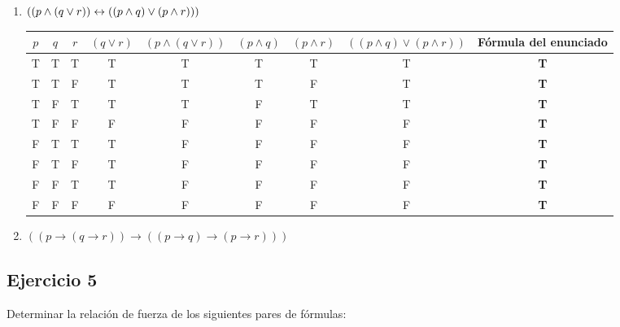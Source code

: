 \begin{enumerate}[label=\alph*)]
    \item $((p \land (q \lor r)) \leftrightarrow ((p \land q) \lor (p \land r)))$

          \begin{tabular}{|c|c|c|c|c|c|c|c|c|}
              \hline
              $p$ & $q$ & $r$ & $(q \lor r)$ & $(p \land (q \lor r))$ & $(p \land q)$ & $(p \land r)$ & $((p \land q) \lor (p \land r))$ & Fórmula del enunciado \\
              \hline
              T   & T   & T   & T            & T                      & T             & T             & T                                & \textbf{T}            \\
              T   & T   & F   & T            & T                      & T             & F             & T                                & \textbf{T}            \\
              T   & F   & T   & T            & T                      & F             & T             & T                                & \textbf{T}            \\
              T   & F   & F   & F            & F                      & F             & F             & F                                & \textbf{T}            \\
              F   & T   & T   & T            & F                      & F             & F             & F                                & \textbf{T}            \\
              F   & T   & F   & T            & F                      & F             & F             & F                                & \textbf{T}            \\
              F   & F   & T   & T            & F                      & F             & F             & F                                & \textbf{T}            \\
              F   & F   & F   & F            & F                      & F             & F             & F                                & \textbf{T}            \\
              \hline
          \end{tabular}

    \item $((p \to (q \to r)) \to ((p \to q) \to (p \to r)))$ \hacer
\end{enumerate}

\subsection{Ejercicio 5}
Determinar la relación de fuerza de los siguientes pares de fórmulas:

